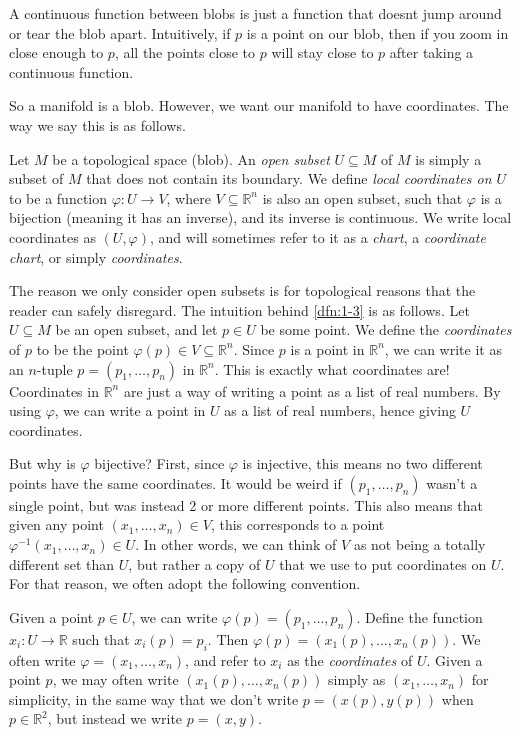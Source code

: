 A continuous function between blobs is just a function that doesnt jump around or tear the blob apart. Intuitively, if $p$ is a point on our blob, then if you zoom in close enough to $p$, all the points close to $p$ will stay close to $p$ after taking a continuous function.

So a manifold is a blob. However, we want our manifold to have coordinates. The way we say this is as follows.
\begin{definition}\label{dfn:1-3}
	Let $M$ be a topological space (blob). An \emph{open subset} $U\subseteq M$ of $M$ is simply a subset of $M$ that does not contain its boundary. We define \emph{local coordinates on $U$} to be a function $\varphi : U \to V$, where $V\subseteq \mathbb{R} ^n$ is also an open subset, such that $\varphi $ is a bijection (meaning it has an inverse), and its inverse is continuous. We write local coordinates as $(U,\varphi )$, and will sometimes refer to it as a \emph{chart}, a \emph{coordinate chart}, or simply \emph{coordinates}.
\end{definition}

The reason we only consider open subsets is for topological reasons that the reader can safely disregard. The intuition behind \cref{dfn:1-3} is as follows. Let $U\subseteq M$ be an open subset, and let $p\in U$ be some point. We define the \emph{coordinates} of $p$ to be the point $\varphi (p)\in V \subseteq \mathbb{R} ^n$. Since $p$ is a point in $\mathbb{R} ^n$, we can write it as an $n$-tuple $p=(p_1, \ldots , p_n)$ in $\mathbb{R} ^n$. This is exactly what coordinates are! Coordinates in $\mathbb{R} ^n$ are just a way of writing a point as a list of real numbers. By using $\varphi $, we can write a point in $U$ as a list of real numbers, hence giving $U$ coordinates.

But why is $\varphi $ bijective? First, since $\varphi $ is injective, this means no two different points have the same coordinates. It would be weird if $(p_1, \ldots , p_n)$ wasn't a single point, but was instead 2 or more different points. This also means that given any point $(x_1, \ldots , x_n)\in V$, this corresponds to a point $\varphi ^{-1} (x_1, \ldots , x_n)\in U$. In other words, we can think of $V$ as not being a totally different set than $U$, but rather a copy of $U$ that we use to put coordinates on $U$. For that reason, we often adopt the following convention.

Given a point $p\in U$, we can write $\varphi (p) = (p_1, \ldots , p_n)$. Define the function $x_i : U \to \mathbb{R} $ such that $x_i(p) = p_i$. Then $\varphi (p) = (x_1(p), \ldots , x_n(p))$. We often write $\varphi =(x_1, \ldots , x_n)$, and refer to $x_i$ as the \emph{coordinates} of $U$. Given a point $p$, we may often write $(x_1(p), \ldots , x_n(p))$ simply as $(x_1, \ldots , x_n)$ for simplicity, in the same way that we don't write $p=(x(p),y(p))$ when $p\in\mathbb{R} ^2$, but instead we write $p=(x,y)$.

